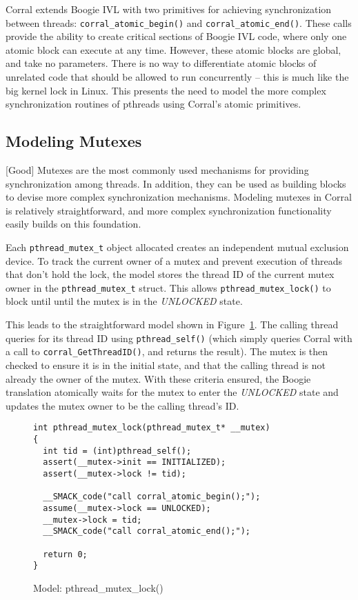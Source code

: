 Corral extends Boogie IVL with two primitives for achieving
synchronization between threads: \lstinline|corral_atomic_begin()| and
\lstinline|corral_atomic_end()|.  These calls provide the ability to
create critical sections of Boogie IVL code, where only one atomic
block can execute at any time.  However, these atomic blocks are
global, and take no parameters.  There is no way to differentiate
atomic blocks of unrelated code that should be allowed to run
concurrently -- this is much like the big kernel lock in Linux.  This
presents the need to model the more complex synchronization routines
of pthreads using Corral's atomic primitives.

\subsection{Modeling Mutexes}
[Good]
Mutexes are the most commonly used mechanisms for providing
synchronization among threads.  In addition, they can be used as
building blocks to devise more complex synchronization mechanisms.
Modeling mutexes in Corral is relatively straightforward, and more
complex synchronization functionality easily builds on this
foundation. 

Each \lstinline|pthread_mutex_t| object allocated creates an
independent mutual exclusion device.  To track the current owner of a
mutex and prevent execution of threads that don't hold the lock, the
model stores the thread ID of the current mutex owner in the
\lstinline|pthread_mutex_t| struct.  This allows
\lstinline|pthread_mutex_lock()| to block until until the mutex is in
the \emph{UNLOCKED} state.

This leads to the straightforward model shown in
Figure~\ref{fig:pthread_mutex_lock}. The calling thread queries for
its thread ID using \lstinline|pthread_self()| (which simply queries
Corral with a call to \lstinline|corral_GetThreadID()|, and returns the
result). The mutex is then checked to ensure it is in the initial
state, and that the calling thread is not already the owner of the
mutex.  With these criteria ensured, the Boogie translation atomically
waits for the mutex to enter the \emph{UNLOCKED} state and updates the
mutex owner to be the calling thread's ID.

\begin{figure}[h]
\centering
\caption{Model: pthread\_mutex\_lock()}\label{fig:pthread_mutex_lock}
\begin{lstlisting}
int pthread_mutex_lock(pthread_mutex_t* __mutex)
{
  int tid = (int)pthread_self();
  assert(__mutex->init == INITIALIZED);
  assert(__mutex->lock != tid);

  __SMACK_code("call corral_atomic_begin();");
  assume(__mutex->lock == UNLOCKED);
  __mutex->lock = tid;
  __SMACK_code("call corral_atomic_end();");

  return 0;
}
\end{lstlisting}
\end{figure}


